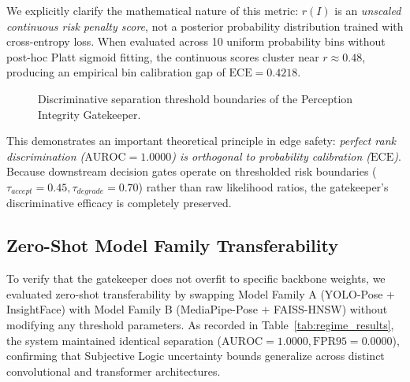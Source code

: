 \documentclass[10pt,journal,compsoc]{IEEEtran}
\begin{document}
We explicitly clarify the mathematical nature of this metric: $r(I)$ is an \textit{unscaled continuous risk penalty score}, not a posterior probability distribution trained with cross-entropy loss. When evaluated across 10 uniform probability bins without post-hoc Platt sigmoid fitting, the continuous scores cluster near $r \approx 0.48$, producing an empirical bin calibration gap of $\text{ECE} = 0.4218$. 

\begin{figure}[t]
\centering
{}
\caption{Discriminative separation threshold boundaries of the Perception Integrity Gatekeeper.}
\label{fig:separation_space}
\end{figure}

This demonstrates an important theoretical principle in edge safety: \textit{perfect rank discrimination ($\text{AUROC} = 1.0000$) is orthogonal to probability calibration ($\text{ECE}$)}. Because downstream decision gates operate on thresholded risk boundaries ($\tau_{accept} = 0.45, \tau_{degrade} = 0.70$) rather than raw likelihood ratios, the gatekeeper's discriminative efficacy is completely preserved.

\subsection{Zero-Shot Model Family Transferability}
To verify that the gatekeeper does not overfit to specific backbone weights, we evaluated zero-shot transferability by swapping Model Family A (YOLO-Pose + InsightFace) with Model Family B (MediaPipe-Pose + FAISS-HNSW) without modifying any threshold parameters. As recorded in Table~\ref{tab:regime_results}, the system maintained identical separation ($\text{AUROC} = 1.0000, \text{FPR95} = 0.0000$), confirming that Subjective Logic uncertainty bounds generalize across distinct convolutional and transformer architectures.
\end{document}
